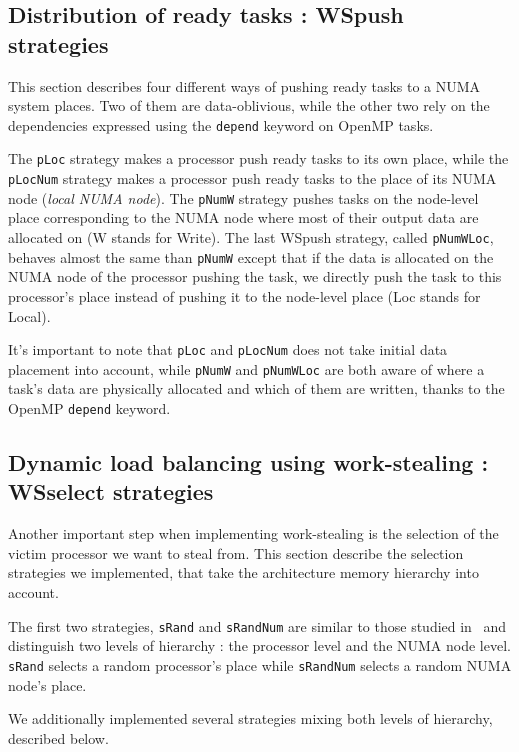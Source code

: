 \documentclass{Styles/llncs}
\begin{document}
\subsection{Distribution of ready tasks : WSpush strategies}

This section describes four different ways of pushing ready tasks to a NUMA system places.
Two of them are data-oblivious, while the other two rely on the dependencies expressed using the \verb!depend! keyword on OpenMP tasks.

The \verb/pLoc/ strategy makes a processor push ready tasks to
    its own place, while the \verb/pLocNum/ strategy makes a processor push ready tasks to the place of its NUMA node (\emph{local NUMA node}).
The \verb/pNumW/ strategy pushes tasks on the node-level place corresponding to the NUMA node where most of their output data are allocated on (W stands for Write).
The last WSpush strategy, called \verb/pNumWLoc/, behaves almost the same than \verb!pNumW! except that if
    the data is allocated on the NUMA node of the processor pushing the task, we directly push the task to this processor's place instead of pushing it to the node-level place (Loc stands for Local).
    
    It's important to note that \verb!pLoc! and \verb!pLocNum! does not take initial data placement into account, while \verb!pNumW! and \verb!pNumWLoc! are both aware of where a task's data are physically allocated and which of them are written, thanks to the OpenMP \verb!depend! keyword.

\subsection{Dynamic load balancing using work-stealing : WSselect strategies}

Another important step when implementing work-stealing is the selection of the victim processor we want to steal from.
This section describe the selection strategies we implemented, that take the architecture memory hierarchy into account.

The first two strategies, \verb!sRand! and \verb!sRandNum! are similar to those studied in~\cite{DBLP:journals/ijhpca/OlivierPWSP12}
and distinguish two levels of hierarchy : the processor level and the NUMA node level.
\verb/sRand/ selects a random processor's place while \verb/sRandNum/ selects a random NUMA node's place.

We additionally implemented several strategies mixing both levels of hierarchy,
described below.
\end{document}
